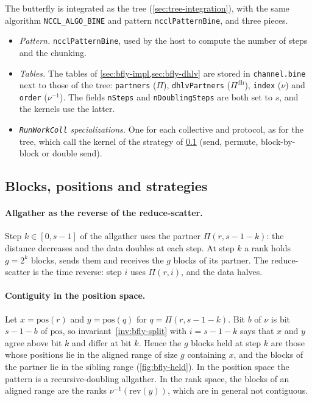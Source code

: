 The butterfly is integrated as the tree (\cref{sec:tree-integration}), with the same algorithm \texttt{NCCL\_ALGO\_BINE} and pattern \texttt{ncclPatternBine}, and three pieces.
\begin{itemize}
  \item \emph{Pattern.} \texttt{ncclPatternBine}, used by the host to compute the number of steps and the chunking.
  \item \emph{Tables.} The tables of \cref{sec:bfly-impl,sec:bfly-dhlv} are stored in \texttt{channel.bine} next to those of the tree: \texttt{partners} ($\Pi$), \texttt{dhlvPartners} ($\Pi^{\mathrm{dh}}$), \texttt{index} ($\nu$) and \texttt{order} ($\nu^{-1}$).
  The fields \texttt{nSteps} and \texttt{nDoublingSteps} are both set to $s$, and the kernels use the latter.
  \item \emph{\texttt{RunWorkColl} specializations.} One for each collective and protocol, as for the tree, which call the kernel of the strategy of \cref{sec:bfly-strategies} (send, permute, block-by-block or double send).
\end{itemize}

\subsection{Blocks, positions and strategies}\label{sec:bfly-strategies}

\paragraph{Allgather as the reverse of the reduce-scatter.}
Step $k\in[0,s-1]$ of the allgather uses the partner $\Pi(r,s-1-k)$: the distance decreases and the data doubles at each step.
At step $k$ a rank holds $g=2^k$ blocks, sends them and receives the $g$ blocks of its partner.
The reduce-scatter is the time reverse: step $i$ uses $\Pi(r,i)$, and the data halves.

\paragraph{Contiguity in the position space.}
Let $x=\mathrm{pos}(r)$ and $y=\mathrm{pos}(q)$ for $q=\Pi(r,s-1-k)$.
Bit $b$ of $\nu$ is bit $s-1-b$ of $\mathrm{pos}$, so invariant~\ref{inv:bfly-split} with $i=s-1-k$ says that $x$ and $y$ agree above bit $k$ and differ at bit $k$.
Hence the $g$ blocks held at step $k$ are those whose positions lie in the aligned range of size $g$ containing $x$, and the blocks of the partner lie in the sibling range (\cref{fig:bfly-held}).
In the position space the pattern is a recursive-doubling allgather. In the rank space, the blocks of an aligned range are the ranks $\nu^{-1}(\mathrm{rev}(y))$, which are in general not contiguous.

